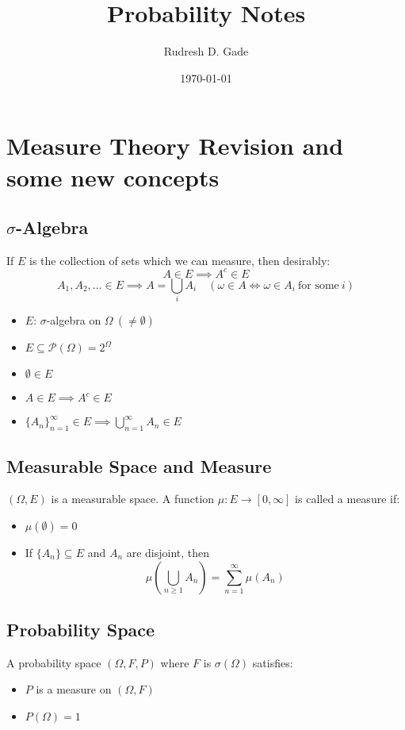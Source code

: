 \documentclass{article}
\begin{document}
\title{Probability Notes}
\author{Rudresh D. Gade}
\date{\today}
\maketitle
\tableofcontents
\newpage

\section{Measure Theory Revision and some new concepts}

\subsection{$\sigma$-Algebra}
If $E$ is the collection of sets which we can measure, then desirably:
\[A \in E \implies A^c \in E\]
\[A_1, A_2, \dots \in E \implies A = \bigcup_{i} A_i \quad (\omega \in A \iff \omega \in A_i \ \text{for some} \ i)\]
\begin{itemize}
    \item $E$: $\sigma$-algebra on $\Omega \ (\neq \emptyset)$
    \item $E \subseteq \mathcal{P}(\Omega) = 2^{\Omega}$
    \item $\emptyset \in E$
    \item $A \in E \implies A^c \in E$
    \item $\{A_n\}_{n=1}^{\infty} \in E \implies \bigcup_{n=1}^{\infty} A_n \in E$
\end{itemize}

\subsection{Measurable Space and Measure}
$(\Omega, E)$ is a measurable space. A function $\mu : E \to [0, \infty]$ is called a measure if:
\begin{itemize}
    \item $\mu(\emptyset) = 0$
    \item If $\{A_n\} \subseteq E$ and $A_n$ are disjoint, then
    \[    \mu\left( \bigcup_{n \geq 1} A_n \right) = \sum_{n=1}^{\infty} \mu(A_n)  \]
\end{itemize}

\subsection{Probability Space}
A probability space $(\Omega, F, P)$ where $F$ is $\sigma(\Omega)$ satisfies:
\begin{itemize}
    \item $P$ is a measure on $(\Omega, F)$
    \item $P(\Omega) = 1$
\end{itemize}
\end{document}
